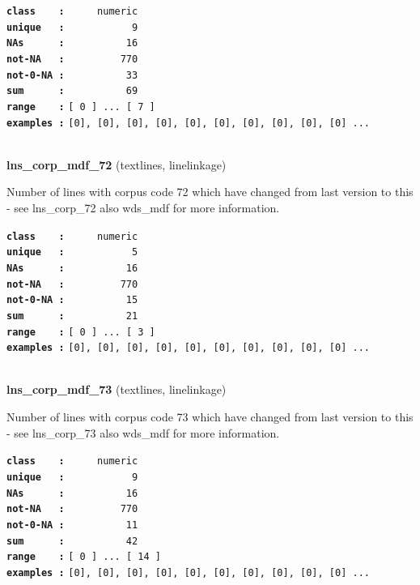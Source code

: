 \documentclass[]{article}
\begin{document}
\textbf{\texttt{class\ \ \ \ :}} \texttt{~~~~~numeric}\\
\textbf{\texttt{unique\ \ \ :}} \texttt{~~~~~~~~~~~9}\\
\textbf{\texttt{NAs\ \ \ \ \ \ :}} \texttt{~~~~~~~~~~16}\\
\textbf{\texttt{not-NA\ \ \ :}} \texttt{~~~~~~~~~770}\\
\textbf{\texttt{not-0-NA\ :}} \texttt{~~~~~~~~~~33}\\
\textbf{\texttt{sum\ \ \ \ \ \ :}} \texttt{~~~~~~~~~~69}\\
\textbf{\texttt{range\ \ \ \ :}}
\texttt{{[}\ 0\ {]}\ ...\ {[}\ 7\ {]}}\\
\textbf{\texttt{examples\ :}}
\texttt{{[}0{]},\ {[}0{]},\ {[}0{]},\ {[}0{]},\ {[}0{]},\ {[}0{]},\ {[}0{]},\ {[}0{]},\ {[}0{]},\ {[}0{]}\ ...}\\

~

\textbf{lns\_corp\_mdf\_72} (textlines, linelinkage)

Number of lines with corpus code 72 which have changed from last version
to this - see lns\_corp\_72 also wds\_mdf for more information.

\textbf{\texttt{class\ \ \ \ :}} \texttt{~~~~~numeric}\\
\textbf{\texttt{unique\ \ \ :}} \texttt{~~~~~~~~~~~5}\\
\textbf{\texttt{NAs\ \ \ \ \ \ :}} \texttt{~~~~~~~~~~16}\\
\textbf{\texttt{not-NA\ \ \ :}} \texttt{~~~~~~~~~770}\\
\textbf{\texttt{not-0-NA\ :}} \texttt{~~~~~~~~~~15}\\
\textbf{\texttt{sum\ \ \ \ \ \ :}} \texttt{~~~~~~~~~~21}\\
\textbf{\texttt{range\ \ \ \ :}}
\texttt{{[}\ 0\ {]}\ ...\ {[}\ 3\ {]}}\\
\textbf{\texttt{examples\ :}}
\texttt{{[}0{]},\ {[}0{]},\ {[}0{]},\ {[}0{]},\ {[}0{]},\ {[}0{]},\ {[}0{]},\ {[}0{]},\ {[}0{]},\ {[}0{]}\ ...}\\

~

\textbf{lns\_corp\_mdf\_73} (textlines, linelinkage)

Number of lines with corpus code 73 which have changed from last version
to this - see lns\_corp\_73 also wds\_mdf for more information.

\textbf{\texttt{class\ \ \ \ :}} \texttt{~~~~~numeric}\\
\textbf{\texttt{unique\ \ \ :}} \texttt{~~~~~~~~~~~9}\\
\textbf{\texttt{NAs\ \ \ \ \ \ :}} \texttt{~~~~~~~~~~16}\\
\textbf{\texttt{not-NA\ \ \ :}} \texttt{~~~~~~~~~770}\\
\textbf{\texttt{not-0-NA\ :}} \texttt{~~~~~~~~~~11}\\
\textbf{\texttt{sum\ \ \ \ \ \ :}} \texttt{~~~~~~~~~~42}\\
\textbf{\texttt{range\ \ \ \ :}}
\texttt{{[}\ 0\ {]}\ ...\ {[}\ 14\ {]}}\\
\textbf{\texttt{examples\ :}}
\texttt{{[}0{]},\ {[}0{]},\ {[}0{]},\ {[}0{]},\ {[}0{]},\ {[}0{]},\ {[}0{]},\ {[}0{]},\ {[}0{]},\ {[}0{]}\ ...}\\
\end{document}
